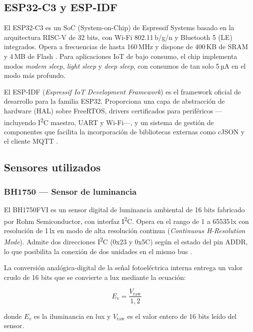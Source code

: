 \subsection{ESP32-C3 y ESP-IDF}

El ESP32-C3 es un SoC (System-on-Chip) de Espressif Systems basado en la
arquitectura RISC-V de 32 bits, con Wi-Fi 802.11\,b/g/n y Bluetooth 5 (LE)
integrados. Opera a frecuencias de hasta 160\,MHz y dispone de 400\,KB de SRAM y
4\,MB de Flash \parencite{EspressifDS2024}. Para aplicaciones IoT de bajo consumo,
el chip implementa modos \textit{modem sleep}, \textit{light sleep} y
\textit{deep sleep}, con consumos de tan solo 5\,µA en el modo más profundo.

El ESP-IDF (\textit{Espressif IoT Development Framework}) es el framework oficial de
desarrollo para la familia ESP32. Proporciona una capa de abstracción de hardware
(HAL) sobre FreeRTOS, drivers certificados para periféricos —incluyendo I\textsuperscript{2}C
maestro, UART y Wi-Fi—, y un sistema de gestión de componentes que facilita la
incorporación de bibliotecas externas como cJSON y el cliente MQTT
\parencite{Espressif2024}.

\subsection{Sensores utilizados}

\subsubsection{BH1750 — Sensor de luminancia}

El BH1750FVI es un sensor digital de luminancia ambiental de 16 bits fabricado por
Rohm Semiconductor, con interfaz I\textsuperscript{2}C. Opera en el rango de 1 a
65535\,lx con resolución de 1\,lx en modo de alta resolución continua
(\textit{Continuous H-Resolution Mode}). Admite dos direcciones I\textsuperscript{2}C
(0x23 y 0x5C) según el estado del pin ADDR, lo que posibilita la conexión de dos
unidades en el mismo bus \parencite{Rohm2011}.

La conversión analógica-digital de la señal fotoeléctrica interna entrega un valor
crudo de 16 bits que se convierte a lux mediante la ecuación:

\begin{equation}
  E_v = \frac{V_{\text{raw}}}{1{,}2}
  \label{eq:bh1750}
\end{equation}

\noindent donde $E_v$ es la iluminancia en lux y $V_{\text{raw}}$ es el valor
entero de 16 bits leído del sensor.

